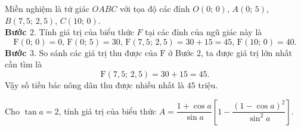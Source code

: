 \begin{ex}
{\begin{center}
	\end{center}
	Miền nghiệm là tứ giác $OABC$ với tọa độ các đỉnh $O(0;\,0)$,  $A(0;\, 5)$, $B(7{,}5;\,2{,}5)$, $C(10;\, 0)$.\\
	\textbf{Bước $2$}. Tính giá trị của biểu thức $F$ tại các đỉnh của ngũ giác này là
	\[\mathrm{F}(0;\,0)= 0,\, \mathrm{F}(0;\,5)=30,\, \mathrm{F}(7{,}5;\, 2{,}5)=30+15=45,\, \mathrm{F}(10;\,0)=40.\]
	\textbf{Bước $3$}. So sánh các giá trị thu được của $\mathrm{F}$ ở Bước $2$, ta được giá trị lớn nhất cần tìm là
	\[\mathrm{F}(7{,}5;\,2{,}5)=30+15=45.\]
	Vậy số tiền bác nông dân thu được nhiều nhất là $45$ triệu. 
	}
\end{ex}
\begin{ex}%
	Cho $\tan a=2$, tính giá trị của biểu thức $A=\dfrac{1+\cos a}{\sin a}\left[1-\dfrac{(1-\cos a)^2}{\sin^2a}\right]$.
\end{ex}

